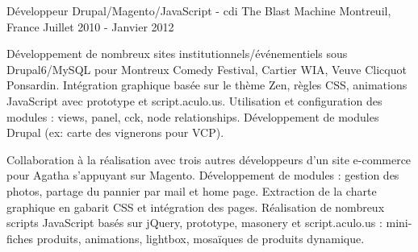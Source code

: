 \cventry
{Développeur Drupal/Magento/JavaScript - cdi} %
{The Blast Machine} %
{Montreuil, France} %
{Juillet 2010 - Janvier 2012} %
{
\begin{cvitems} %
    \item
    {
    Développement de nombreux sites institutionnels/événementiels sous Drupal6/MySQL pour
    Montreux Comedy Festival, Cartier WIA, Veuve Clicquot Ponsardin.
    Intégration graphique basée sur le thème Zen, règles CSS,
    animations JavaScript avec prototype et script.aculo.us.
    Utilisation et configuration des modules : views, panel, cck, node relationships.
    Développement de modules Drupal (ex: carte des vignerons pour VCP).
    }
    \item
    {
    Collaboration à la réalisation avec trois autres développeurs d'un site e-commerce
    pour Agatha s'appuyant sur Magento.
    Développement de modules : gestion des photos, partage du pannier par mail et home page.
    Extraction de la charte graphique en gabarit CSS et intégration des pages.
    Réalisation de nombreux scripts JavaScript basés sur jQuery, prototype, masonery et script.aculo.us :
    mini-fiches produits, animations, lightbox, mosaïques de produits dynamique.
    }
\end{cvitems}
}